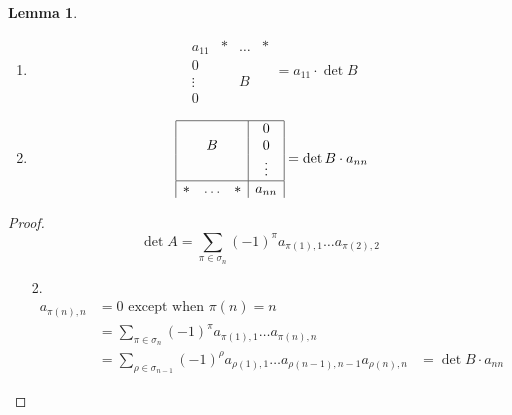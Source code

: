 \documentclass[a4paper,landscape,twocolumn]{article}
\theoremstyle{definition}
\newtheorem{lemma}{Lemma}
\begin{document}
\begin{lemma}
  \label{lemma-7.35}
  \begin{enumerate}
    \item
      \[
        \begin{array}{|c|ccc|}
          \hline
            a_{11} & * & \ldots & * \\
          \hline
            0      &   &        &  \\
            \vdots &   &  B     &  \\
            0      &   &        &
        \end{array}
        = a_{11} \cdot \det{B}
      \]
    \item
      \[
        \begin{array}{|ccc|c|}
          \hline
                &        &   & 0 \\
                & B      &   & 0  \\
                &        &   & \vdots \\
          \hline
            *   & \ldots & * & a_{nn}
        \end{array}
        = \det{B} \cdot a_{nn}
      \]
  \end{enumerate}
\end{lemma}

\begin{proof}
  \[ \det{A} = \sum_{\pi \in \sigma_n} (-1)^\pi a_{\pi(1),1} \ldots a_{\pi(2),2} \]

  \begin{enumerate}
    \item[2.]
      \begin{align*}
        a_{\pi(n),n} &= 0 \text{ except when } \pi(n) = n \\
          &= \sum_{\pi \in \sigma_n} (-1)^\pi a_{\pi(1),1} \ldots a_{\pi(n),n} \\
          &= \sum_{\rho \in \sigma_{n-1}} (-1)^\rho a_{\rho(1),1} \ldots a_{\rho(n-1),n-1} a_{\rho(n),n}
          &= \det{B} \cdot a_{nn}
      \end{align*}
  \end{enumerate}
\end{proof}
\end{document}
